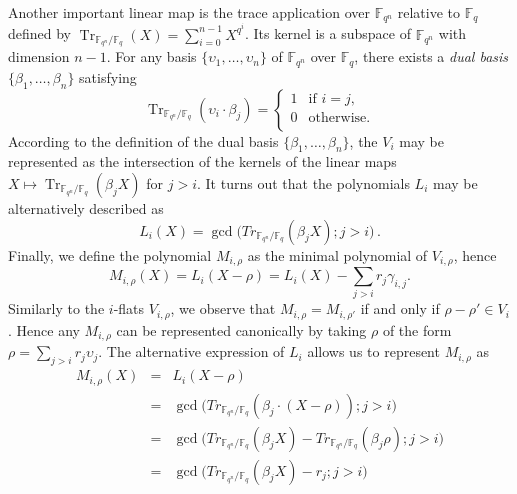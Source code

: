 \documentclass{article}
\newcommand{\ff}[1]{\mathbb{F}_{#1}}
\newcommand{\qq}{q}
\newcommand{\nn}{n}
\newcommand{\qn}{{\qq^\nn}}
\newcommand{\basef}{\ff{\qq}}
\newcommand{\extf}{\ff{\qn}}
\DeclareMathOperator{\Tr}{Tr}
\DeclareMathOperator{\Ker}{Ker}
\begin{document}
Another important linear map is the trace application over $\extf$ relative to $\basef$ defined by $\Tr_{\extf/\basef}(X)=\sum_{i=0}^{n-1} X^{\qq^i}$. Its kernel is a subspace of $\extf$ with dimension $n-1$. For any basis $\{\upsilon_1,\ldots,\upsilon_\nn\}$ of $\extf$ over $\basef$, there exists a \emph{dual basis} $\{\beta_1,\ldots,\beta_\nn\}$ satisfying  
$$
\Tr_{\extf/\basef}(\upsilon_i \cdot \beta_j)=
\left\{
\begin{array}{ll}
1 & \mbox{if } i=j, \\
0 &  \mbox{otherwise}. \\
\end{array}
\right.
$$
According to the definition of the dual  basis $\{\beta_1,\ldots,\beta_\nn\}$, the $V_i$ may be represented as 
the intersection of the kernels of the linear maps $X \mapsto \Tr_{\extf/\basef}(\beta_j X )$ for $j>i$. It turns out that the polynomials 
 $L_i$ may be alternatively described as
 \begin{equation}
 \label{L_i_alt_formula}
 L_i(X)=\gcd\bigl(Tr_{\extf/\basef}(\beta_j X );j>i\bigr) \,.
 \end{equation}
Finally, we define the polynomial $M_{i,\rho}$ as the minimal
polynomial of $V_{i,\rho}$, hence
\begin{equation}
  M_{i,\rho}(X) = L_i(X - \rho) = L_i(X) - \sum_{j>i}r_j\gamma_{i,j}.
\end{equation}
Similarly to the $i$-flats $V_{i,\rho}$, we observe that $M_{i,\rho}=M_{i,\rho'}$ if and only if $\rho-\rho'\in V_i$. Hence
any $M_{i,\rho}$ can be represented canonically by taking $\rho$ of
the form $\rho=\sum_{j>i}r_j\upsilon_j$. The alternative expression of $L_i$ allows us to represent $M_{i,\rho}$ as
\begin{equation}
\label{alternative_M_i_rho}
\begin{array}{lll}
M_{i,\rho}(X)&=& L_i(X-\rho) \\
&=&\gcd\bigl(Tr_{\extf/\basef}(\beta_j \cdot  (X-\rho) );j>i\bigr)  \\
&=& \gcd\bigl(Tr_{\extf/\basef}(\beta_j X) -Tr_{\extf/\basef}(\beta_j \rho) ;j>i\bigr)  \\
&=&  \gcd\bigl(Tr_{\extf/\basef}(\beta_j X) -r_j ;j>i\bigr)  \\
\end{array}
\end{equation}
\end{document}
